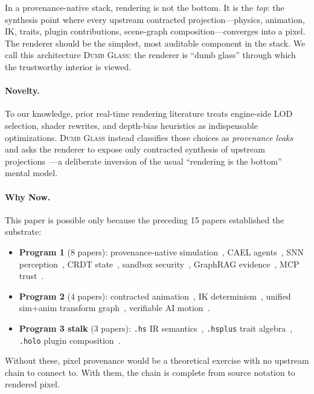 \documentclass[sigconf,nonacm]{acmart}
\newcommand{\dumbglass}{\textsc{Dumb Glass}}
\begin{document}
In a provenance-native stack, rendering is not the bottom.
It is the \emph{top}: the synthesis point where every upstream
contracted projection---physics, animation, IK, traits, plugin
contributions, scene-graph composition---converges into a
pixel. The renderer should be the simplest, most auditable
component in the stack. We call this architecture \dumbglass{}:
the renderer is ``dumb glass'' through which the trustworthy
interior is viewed.

\paragraph{Novelty.}
To our knowledge, prior real-time rendering literature treats
engine-side LOD selection, shader rewrites, and depth-bias heuristics
as indispensable optimizations. \dumbglass{} instead classifies those
choices as \emph{provenance leaks} and asks the renderer to expose only
contracted synthesis of upstream projections~\cite{trustbyconstruction2026}---a
deliberate inversion of the usual ``rendering is the bottom'' mental model.

\paragraph{Why Now.}
This paper is possible only because the preceding 15 papers
established the substrate:
\begin{itemize}
  \item \textbf{Program 1} (8 papers): provenance-native
    simulation~\cite{trustbyconstruction2026}, CAEL
    agents~\cite{paper-0c-cael-aamas2027}, SNN
    perception~\cite{paper-2-snn-neurips2026}, CRDT
    state~\cite{paper-3-crdt-ecoop2027}, sandbox
    security~\cite{paper-4-sandbox-usenix}, GraphRAG
    evidence~\cite{paper-5-graphrag-icse}, MCP
    trust~\cite{paper-1-mcp-usenix2027}.
  \item \textbf{Program 2} (4 papers): contracted
    animation~\cite{paper-6-anim-sca2027}, IK
    determinism~\cite{paper-7-ik-siggraph2027}, unified
    sim+anim transform graph~\cite{paper-8-unified-siggraph2027},
    verifiable AI motion~\cite{paper-9-motion-asia2027}.
  \item \textbf{Program 3 stalk} (3 papers): \texttt{.hs} IR
    semantics~\cite{paper-10-hs-core-pldi2027}, \texttt{.hsplus}
    trait algebra~\cite{paper-11-hsplus-ecoop2027}, \texttt{.holo}
    plugin composition~\cite{paper-12-holo-i3d2027}.
\end{itemize}
Without these, pixel provenance would be a theoretical exercise
with no upstream chain to connect to. With them, the chain is
complete from source notation to rendered pixel.
\end{document}
